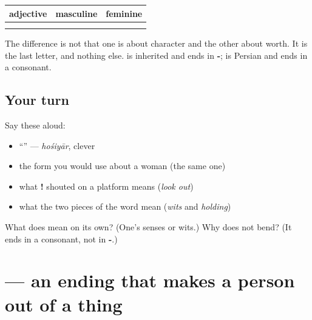 \begin{grammarlens}[title={Grammar Lens: the first one that does not bend}]
\noindent
\begin{tabularx}{\linewidth}{@{}>{\raggedright\arraybackslash}X>{\raggedright\arraybackslash}X>{\raggedright\arraybackslash}X@{}}
\toprule
\textbf{adjective} & \textbf{masculine} & \textbf{feminine} \\
\midrule
\hi{बुरा} & \hi{बुरा} & \hi{बुरी} \\
\hi{होशियार} & \hi{होशियार} & \hi{होशियार} \\
\bottomrule
\end{tabularx}

The difference is not that one is about character and the other about worth. It is the last letter, and nothing else. \textbf{} is inherited and ends in \textbf{-}; \textbf{} is Persian and ends in a consonant.
\end{grammarlens}

\subsection*{Your turn}
Say these aloud:

\begin{itemize}
\raggedright
  \item \textquotedblleft{}\textquotedblright{} — \emph{hośiyār}, clever
  \item the form you would use about a woman (the same one)
  \item what \textbf{!} shouted on a platform means (\emph{look out})
  \item what the two pieces of the word mean (\emph{wits} and \emph{holding})
\end{itemize}

\begin{tcolorbox}[breakable,colback=teal!4,colframe=teal!35!black,title={Before you move on}]
What does \textbf{} mean on its own? (One's senses or wits.) Why does \textbf{} not bend? (It ends in a consonant, not in \textbf{-}.)
\end{tcolorbox}
\section[\texorpdfstring{\hi{मेहनती} (mehnatī)}{मेहनती (mehnatī)}]{ — an ending that makes a person out of a thing}

\label{lesson:HI-C83-mehnati}



